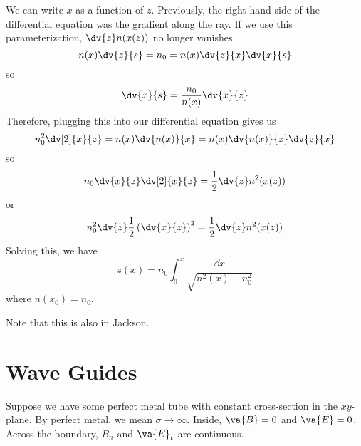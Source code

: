 \documentclass[a4paper,twoside,master.tex]{subfiles}
\begin{document}
\begin{ex}
    We can write $ x $ as a function of $ z $. Previously, the right-hand side of the differential equation was the gradient along the ray. If we use this parameterization, $ \dv{z} n(x(z)) $ no longer vanishes.
    \begin{equation}
        n(x) \dv{z}{s} = n_0 = n(x) \dv{z}{x} \dv{x}{s}
    \end{equation}
    so
    \begin{equation}
        \dv{x}{s} = \frac{n_0}{n(x)} \dv{x}{z}
    \end{equation}
    Therefore, plugging this into our differential equation gives us
    \begin{equation}
        n_0^2 \dv[2]{x}{z} = n(x) \dv{n(x)}{x} = n(x) \dv{n(x)}{z} \dv{z}{x}
    \end{equation}
    so
    \begin{equation}
        n_0 \dv{x}{z} \dv[2]{x}{z} = \frac{1}{2} \dv{z}n^2(x(z))
    \end{equation}
    or
    \begin{equation}
        n_0^2 \dv{z} \frac{1}{2} \left( \dv{x}{z} \right)^2 = \frac{1}{2} \dv{z} n^2(x(z))
    \end{equation}
    Solving this, we have
    \begin{equation}
        z(x) = n_0 \int_0^x \frac{\dd{x}}{\sqrt{n^2(x) - n_0^2}}
    \end{equation}
    where $ n(x_0) = n_0 $.
    
    Note that this is also in Jackson.
\end{ex}

\section{Wave Guides}
\label{sec:wave_guides}

Suppose we have some perfect metal tube with constant cross-section in the $ xy $-plane. By perfect metal, we mean $ \sigma \to \infty $. Inside, $ \va{B} = 0 $ and $ \va{E} = 0 $. Across the boundary, $ B_n $ and $ \va{E}_t $ are continuous.
\end{document}
